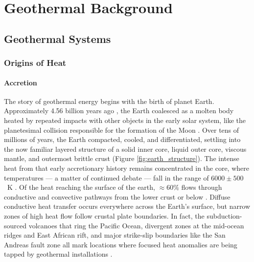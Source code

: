 \chapter{Geothermal Background}\label{ch2:background}
\section{Geothermal Systems}\label{ch2:geosys}
\subsection{Origins of Heat}\label{ch2:heatorig}
\subsubsection{Accretion}\label{ch2:accrete}
The story of geothermal energy begins with the birth of planet Earth. Approximately 4.56 billion years ago \citep{allegre_age_1995, patterson_age_1956}, the Earth coalesced as a molten body heated by repeated impacts with other objects in the early solar system, like the planetesimal collision responsible for the formation of the Moon \citep{stevenson_origin_2014}. Over tens of millions of years, the Earth compacted, cooled, and differentiated, settling into the now familiar layered structure of a solid inner core, liquid outer core, viscous mantle, and outermost brittle crust \citep[p.\ 7]{press_understanding_2004} (Figure \ref{fig:earth_structure}). The intense heat from that early accretionary history remains concentrated in the core, where temperatures --- a matter of continued debate --- fall in the range of $6000\pm500$~K \citep[p.\ 372]{fowler_solid_2005}. Of the heat reaching the surface of the earth, $\approx 60\%$ flows through conductive and convective pathways from the lower crust or below \citep{stein_heat_1995}. Diffuse conductive heat transfer occurs everywhere across the Earth’s surface, but narrow zones of high heat flow follow crustal plate boundaries. In fact, the subduction-sourced volcanoes that ring the Pacific Ocean, divergent zones at the mid-ocean ridges and East African rift, and major strike-slip boundaries like the San Andreas fault zone all mark locations where focused heat anomalies are being tapped by geothermal installations \citep[p.\ 16]{dipippo_geothermal_2012}.

